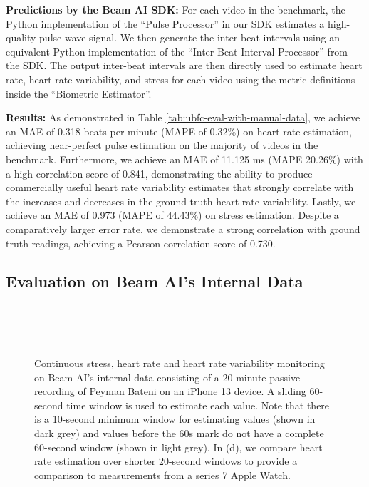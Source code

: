 \documentclass{article}
\begin{document}
\textbf{Predictions by the Beam AI SDK:} For each video in the benchmark, the Python implementation of the ``Pulse Processor'' in our SDK estimates a high-quality pulse wave signal. We then generate the inter-beat intervals using an equivalent Python implementation of the  ``Inter-Beat Interval Processor'' from the SDK. The output inter-beat intervals are then directly used to estimate heart rate, heart rate variability, and stress for each video using the metric definitions inside the ``Biometric Estimator''.

\textbf{Results:} As demonstrated in Table \ref{tab:ubfc-eval-with-manual-data}, we achieve an MAE of 0.318 beats per minute (MAPE of 0.32\%) on heart rate estimation, achieving near-perfect pulse estimation on the majority of videos in the benchmark. Furthermore, we achieve an MAE of 11.125 ms (MAPE 20.26\%) with a high correlation score of 0.841, demonstrating the ability to produce commercially useful heart rate variability estimates that strongly correlate with the increases and decreases in the ground truth heart rate variability. Lastly, we achieve an MAE of 0.973 (MAPE of 44.43\%) on stress estimation. Despite a comparatively larger error rate, we demonstrate a strong correlation with ground truth readings, achieving a Pearson correlation score of 0.730.

\subsection{Evaluation on Beam AI's Internal Data}
\label{sec:iphone-data}

\begin{figure}[t]
    \centering
     \\
    \vspace{-0.1in}
     \\
    \vspace{-0.1in}
    \\
    \vspace{-0.1in}
    \caption{Continuous stress, heart rate and heart rate variability monitoring on Beam AI's internal data consisting of a 20-minute passive recording of Peyman Bateni on an iPhone 13 device. A sliding 60-second time window is used to estimate each value. Note that there is a 10-second minimum window for estimating values (shown in dark grey) and values before the 60s mark do not have a complete 60-second window (shown in light grey). In (d), we compare heart rate estimation over shorter 20-second windows to provide a comparison to measurements from a series 7 Apple Watch.}
    \label{fig:beam-ai-data}
    \vspace{-0.2in}
\end{figure}
\end{document}
